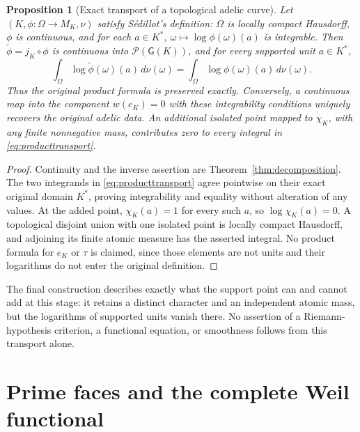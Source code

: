 \documentclass[11pt,a4paper]{article}
\newtheorem{proposition}[theorem]{Proposition}
\theoremstyle{definition}\newtheorem{definition}[theorem]{Definition}
\newcommand{\G}{\mathsf G}\newcommand{\Tor}{\operatorname{Tor}}\newcommand{\Frac}{\operatorname{Frac}}
\begin{document}
\begin{proposition}[Exact transport of a topological adelic curve]
\label{prop:adelictransport}
Let $(K,\phi:\Omega\to M_K,\nu)$ satisfy S\'edillot's definition:
$\Omega$ is locally compact Hausdorff, $\phi$ is continuous, and for
each $a\in K^*$, $\omega\mapsto\log\phi(\omega)(a)$ is integrable.
Then $\widetilde\phi=j_K\circ\phi$ is continuous into
$\mathcal P(\G(K))$, and for every supported unit $a\in K^*$,
\[
 \int_\Omega\log\widetilde\phi(\omega)(a)\,d\nu(\omega)
 =\int_\Omega\log\phi(\omega)(a)\,d\nu(\omega).
 \tag{AV8.1}\label{eq:producttransport}
\]
Thus the original product formula is preserved exactly. Conversely,
a continuous map into the component $w(e_K)=0$ with these integrability
conditions uniquely recovers the original adelic data. An additional
isolated point mapped to $\chi_K$, with any finite nonnegative mass,
contributes zero to every integral in \eqref{eq:producttransport}.
\end{proposition}
\begin{proof}
Continuity and the inverse assertion are
Theorem~\ref{thm:decomposition}. The two integrands in
\eqref{eq:producttransport} agree pointwise on their exact original
domain $K^*$, proving integrability and equality without alteration of
any values. At the added point, $\chi_K(a)=1$ for every such $a$, so
$\log\chi_K(a)=0$. A topological disjoint union with one isolated point
is locally compact Hausdorff, and adjoining its finite atomic measure
has the asserted integral. No product formula for $e_K$ or $\tau$ is
claimed, since those elements are not units and their logarithms do
not enter the original definition.
\end{proof}

The final construction describes exactly what the support point can
and cannot add at this stage: it retains a distinct character and an
independent atomic mass, but the logarithms of supported units vanish
there. No assertion of a Riemann-hypothesis criterion, a functional
equation, or smoothness follows from this transport alone.




\section{Prime faces and the complete Weil functional}
\label{sec:prime-faces-weil}
\end{document}
